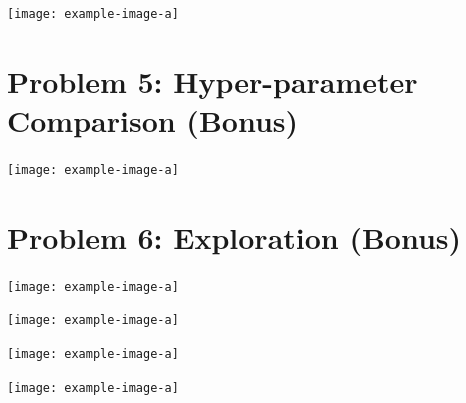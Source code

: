 \documentclass{article}
\begin{document}
\begin{answer}[title=Plot,height=9.5cm,width=\linewidth]
    \centering
    \texttt{[image: example-image-a]}
\end{answer}


\section{Problem 5: Hyper-parameter Comparison (Bonus)}
\begin{answer}[title=Plot,height=9.5cm,width=\linewidth]
    \centering
    \texttt{[image: example-image-a]}
\end{answer}


\section{Problem 6: Exploration (Bonus)}
\begin{answer}[title=Plot,height=9.5cm,width=\linewidth]
    \centering
    \texttt{[image: example-image-a]}
\end{answer}

\begin{answer}[title=Plot,height=9.5cm,width=\linewidth]
    \centering
    \texttt{[image: example-image-a]}
\end{answer}

\begin{answer}[title=Plot,height=9.5cm,width=\linewidth]
    \centering
    \texttt{[image: example-image-a]}
\end{answer}

\begin{answer}[title=Plot,height=9.5cm,width=\linewidth]
    \centering
    \texttt{[image: example-image-a]}
\end{answer}
\end{document}

